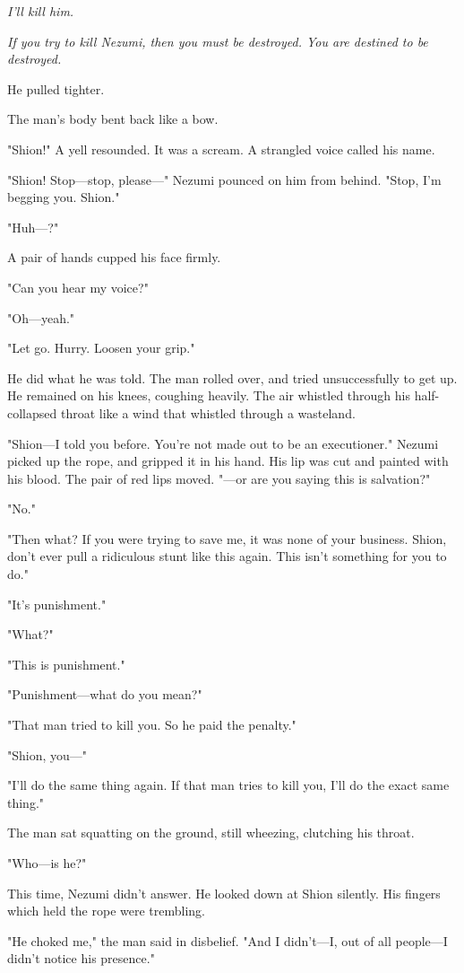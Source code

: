 \emph{I'll kill him.}

\emph{If you try to kill Nezumi, then you must be destroyed. You are destined
to be destroyed.}

He pulled tighter.

The man's body bent back like a bow.

"Shion!" A yell resounded. It was a scream. A strangled voice called his
name.

"Shion! Stop---stop, please---" Nezumi pounced on him from behind. "Stop,
I'm begging you. Shion."

"Huh---?"

A pair of hands cupped his face firmly.

"Can you hear my voice?"

"Oh---yeah."

"Let go. Hurry. Loosen your grip."

He did what he was told. The man rolled over, and tried unsuccessfully
to get up. He remained on his knees, coughing heavily. The air whistled
through his half-collapsed throat like a wind that whistled through a
wasteland.

"Shion---I told you before. You're not made out to be an executioner."
Nezumi picked up the rope, and gripped it in his hand. His lip was cut
and painted with his blood. The pair of red lips moved. "---or are you
saying this is salvation?"

"No."

"Then what? If you were trying to save me, it was none of your business.
Shion, don't ever pull a ridiculous stunt like this again. This isn't
something for you to do."

"It's punishment."

"What?"

"This is punishment."

"Punishment---what do you mean?"

"That man tried to kill you. So he paid the penalty."

"Shion, you---"

"I'll do the same thing again. If that man tries to kill you, I'll do
the exact same thing."

The man sat squatting on the ground, still wheezing, clutching his
throat.

"Who---is he?"

This time, Nezumi didn't answer. He looked down at Shion silently. His
fingers which held the rope were trembling.

"He choked me," the man said in disbelief. "And I didn't---I, out of all
people---I didn't notice his presence."

